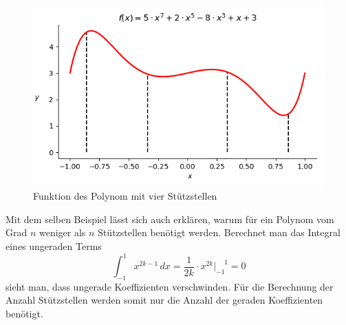 \begin{figure}[!h]
    \centering
    \includegraphics[scale=0.7]{papers/quadratur/figures/polynom.png}
    \caption{ Funktion des Polynom mit vier Stützstellen
    \label{quadratur:figure:polynom}}
\end{figure}
\newpage
\noindent
Mit dem selben Beispiel lässt sich auch erklären, warum für ein Polynom vom Grad $n$ 
weniger als $n$ Stützstellen benötigt werden.
\noindent
Berechnet man das Integral eines ungeraden Terms
\begin{equation}
    \int_{-1}^{1}x^{2k-1}\,dx 
    =
     \frac{1}{2k} \cdot x^{2k} \bigg|_{-1}^{\phantom{-}1}
    = 
    0
\end{equation} 
sieht man, dass ungerade Koeffizienten verschwinden. 
Für die Berechnung der Anzahl Stützstellen werden somit 
nur die Anzahl der geraden Koeffizienten benötigt.
\newline
